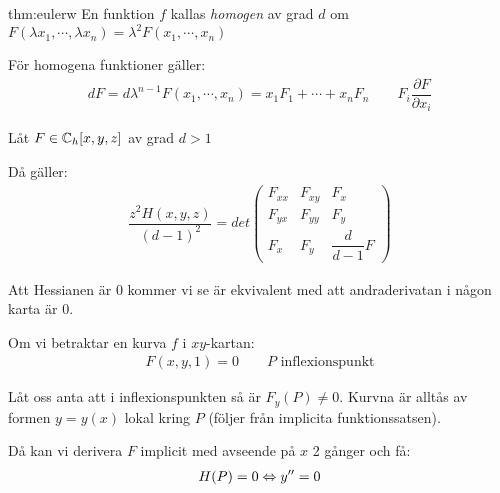 \begin{lem}{thm:eulerw}
  En funktion $f$ kallas \textit{homogen} av grad $d$ om $F(\lambda x_1,\cdots,\lambda x_n) = \lambda^2 F(x_1,\cdots, x_n)$\par
  \noindent För homogena funktioner gäller:
  \begin{equation*}
    \begin{gathered}
      dF = d\lambda^{n-1}F(x_1,\cdots,x_n) = x_1F_1+\cdots+x_nF_n\qquad F_i \dfrac{\partial F}{\partial x_i}
    \end{gathered}
  \end{equation*}
  \par\bigskip
  \noindent Låt $F\in\mathbb{C}_h[x,y,z]$ av grad $d>1$\par
  \noindent Då gäller:
  \begin{equation*}
    \begin{gathered}
      \dfrac{z^2H(x,y,z)}{(d-1)^2} = det\begin{pmatrix}F_{xx}&F_{xy}&F_{x}\\F_{yx}&F_{yy}&F_{y}\\F_{x}&F_{y}&\dfrac{d}{d-1}F\end{pmatrix}
    \end{gathered}
  \end{equation*}
\end{lem}
\par\bigskip
\noindent Att Hessianen är 0 kommer vi se är ekvivalent med att andraderivatan i någon karta är 0.
\par\bigskip
\noindent Om vi betraktar en kurva $f$ i $xy$-kartan:
\begin{equation*}
  \begin{gathered}
    F(x,y,1) = 0\qquad P \text{ inflexionspunkt}
  \end{gathered}
\end{equation*}\par
\noindent Låt oss anta att i inflexionspunkten så är $F_y(P)\neq0$. Kurvna är alltås av formen $y = y(x)$ lokal kring $P$ (följer från implicita funktionssatsen). \par
\noindent Då kan vi derivera $F$ implicit med avseende på $x$ 2 gånger och få:
\begin{equation*}
  \begin{gathered}
    H(P) = 0\Leftrightarrow y^{\prime\prime} = 0
  \end{gathered}
\end{equation*}
\par\bigskip
